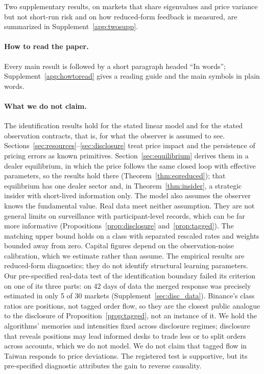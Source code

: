 \documentclass[12pt]{article}
\theoremstyle{definition}
\theoremstyle{remark}
\begin{document}
Two supplementary results, on markets that share eigenvalues and price variance but not short-run risk and on how reduced-form feedback is measured, are summarized in Supplement~\ref{app:twosupp}.

\paragraph{How to read the paper.} Every main result is followed by a short paragraph headed ``In words''; Supplement~\ref{app:howtoread} gives a reading guide and the main symbols in plain words.

\paragraph{What we do not claim.} The identification results hold for the stated linear model and for the stated observation contracts, that is, for what the observer is assumed to see. Sections~\ref{sec:resources}--\ref{sec:disclosure} treat price impact and the persistence of pricing errors as known primitives. Section~\ref{sec:equilibrium} derives them in a dealer equilibrium, in which the price follows the same closed loop with effective parameters, so the results hold there (Theorem~\ref{thm:eqreduced}); that equilibrium has one dealer sector and, in Theorem~\ref{thm:insider}, a strategic insider with short-lived information only. The model also assumes the observer knows the fundamental value. Real data meet neither assumption. They are not general limits on surveillance with participant-level records, which can be far more informative (Propositions~\ref{prop:disclosure} and~\ref{prop:tagged}). The matching upper bound holds on a class with separated rescaled rates and weights bounded away from zero. Capital figures depend on the observation-noise calibration, which we estimate rather than assume. The empirical results are reduced-form diagnostics; they do not identify structural learning parameters. Our pre-specified real-data test of the identification boundary failed its criterion on one of its three parts: on 42 days of data the merged response was precisely estimated in only 5 of 30 markets (Supplement~\ref{sec:disc_data}). Binance's class ratios are positions, not tagged order flow, so they are the closest public analogue to the disclosure of Proposition~\ref{prop:tagged}, not an instance of it. We hold the algorithms' memories and intensities fixed across disclosure regimes; disclosure that reveals positions may lead informed desks to trade less or to split orders across accounts, which we do not model. We do not claim that tagged flow in Taiwan responds to price deviations. The registered test is supportive, but its pre-specified diagnostic attributes the gain to reverse causality.
\end{document}
